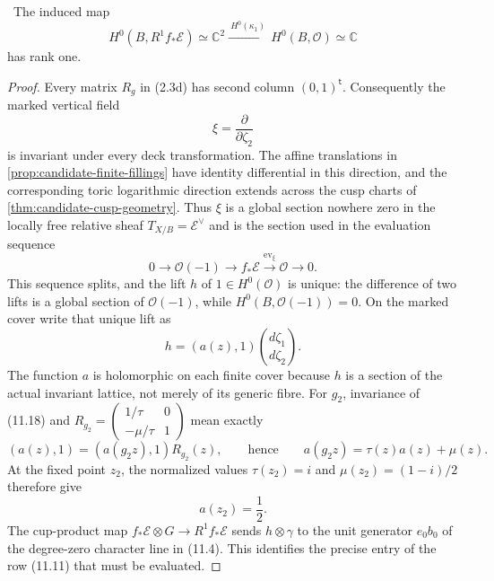 \begin{theorem}
\label{thm:h12-scalar}
\Verified\ The induced map
\[
 H^0(B,R^1f_*\mathcal E)\simeq\mathbb C^2
 \xrightarrow{\ H^0(\kappa_1)\ }
 H^0(B,\mathcal O)\simeq\mathbb C
\]
has rank one.
\end{theorem}

\begin{proof}
Every matrix $R_g$ in (2.3d) has second column $(0,1)^{\mathsf t}$.
Consequently the marked vertical field
\[
 \xi=\frac{\partial}{\partial\zeta_2}
\]
is invariant under every deck transformation.  The affine translations in
\cref{prop:candidate-finite-fillings} have identity differential in this
direction, and the corresponding toric logarithmic direction extends across
the cusp charts of \cref{thm:candidate-cusp-geometry}.  Thus $\xi$ is a
global section nowhere zero in the locally free relative sheaf
$T_{X/B}=\mathcal E^\vee$ and is the section used in the evaluation sequence
\[
 0\longrightarrow\mathcal O(-1)\longrightarrow f_*\mathcal E
 \xrightarrow{\operatorname{ev}_\xi}\mathcal O\longrightarrow0.
\]
This sequence splits, and the lift $h$ of $1\in H^0(\mathcal O)$ is unique:
the difference of two lifts is a global section of $\mathcal O(-1)$, while
$H^0(B,\mathcal O(-1))=0$.  On the marked cover write that unique lift as
\[
 h=(a(z),1)\binom{d\zeta_1}{d\zeta_2}.
\tag{11.18}
\]
The function $a$ is holomorphic on each finite cover because $h$ is a
section of the actual invariant lattice, not merely of its generic fibre.
For $g_2$, invariance of (11.18) and
$R_{g_2}=\left(\begin{smallmatrix}1/\tau&0\\-\mu/\tau&1\end{smallmatrix}\right)$
mean exactly
\[
 (a(z),1)=(a(g_2z),1)R_{g_2}(z),
 \qquad\text{hence}\qquad
 a(g_2z)=\tau(z)a(z)+\mu(z).
\tag{11.18a}
\]
At the fixed point $z_2$, the normalized values
$\tau(z_2)=i$ and $\mu(z_2)=(1-i)/2$ therefore give
\[
 a(z_2)=\frac12.
\tag{11.18b}
\]
The cup-product map
$f_*\mathcal E\otimes G\to R^1f_*\mathcal E$ sends
$h\otimes\gamma$ to the unit generator $e_0b_0$ of the degree-zero
character line in (11.4).  This identifies the precise entry of the row
(11.11) that must be evaluated.


\end{proof}
